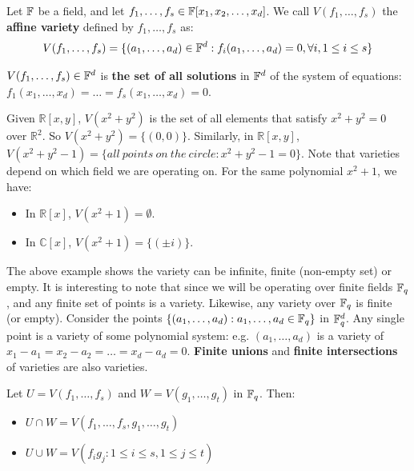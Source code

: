 \begin{Definition}
Let ${\mathbb{F}}$ be a field, and let $f_1, \ldots, f_s 
\in {\mathbb{F}}[x_1, x_2, \ldots, x_d]$. 
We call $V(f_1, \dots, f_s)$ the {\bf affine variety} 
defined by $f_1, \dots, f_s$ as:
\begin{equation}
V(f_1, \ldots, f_s)= \{(a_1, \ldots, a_{d})\in {\mathbb{F}}^d:f_i(a_1, \ldots, a_d)=0, \forall{i},1\le i \le s\}
\end{equation}
\end{Definition}

$V(f_1, \dots, f_s)\in {\mathbb{F}}^d$ is {\bf the set of all solutions} in ${\mathbb{F}}^d$ 
of the system of equations: 
$f_1(x_1,\ldots,x_d)=\dots=f_s(x_1,\dots,x_d)=0$. 

\begin{Example}
Given $\mathbb{R}\left[x,y\right]$, $V(x^2+y^2)$ is the set of all elements
that satisfy $x^2+y^2=0$ over $\mathbb{R}^2$. So $V(x^2+y^2)=\{(0,0)\}$. 
Similarly, in $\mathbb{R}\left[x,y\right]$, $V(x^2+y^2-1)=\{all\  points\  on\ the\ circle: x^2+y^2-1=0\}$.
Note that varieties depend on which field we are operating on. 
For the same polynomial $x^2+1$, we have:
\begin{itemize}
\item In $\mathbb{R}[x]$, $V(x^2+1)=\emptyset$.
\item In $\mathbb{C}[x]$, $V(x^2+1)=\{(\pm i)\}$.
\end{itemize}
\end{Example}

The above example shows the variety can be infinite, finite (non-empty set) 
or empty. It is interesting to note that since we will be operating over
finite fields ${\mathbb{F}}_{q}$, and any finite set of points is a variety. Likewise,
any variety over ${\mathbb{F}}_{q}$ is finite (or empty).
Consider the points $\{(a_1,\dots, a_d): a_1, \dots, a_d \in {\mathbb{F}}_q\}$
in ${\mathbb{F}}_q^d$. Any single point is a variety of some polynomial system:
e.g. $(a_1,\dots, a_d)$ is a variety of $x_1-a_1 = x_2 - a_2 = \dots =
x_d-a_d=0$. {\bf Finite unions} and {\bf finite  intersections} of
varieties are also varieties. 

\begin{Example}
Let $U = V(f_1, \dots, f_s)$ and $W =
V(g_1, \dots, g_t)$ in ${\mathbb{F}}_{q}$. Then:  
\begin{itemize}
\item $U \cap W = V(f_1, \dots, f_s, g_1, \dots, g_t)$
\item $U \cup W = V(f_i g_j: 1 \leq i \leq s, 1 \leq j \leq t)$
\end{itemize}
\end{Example}

